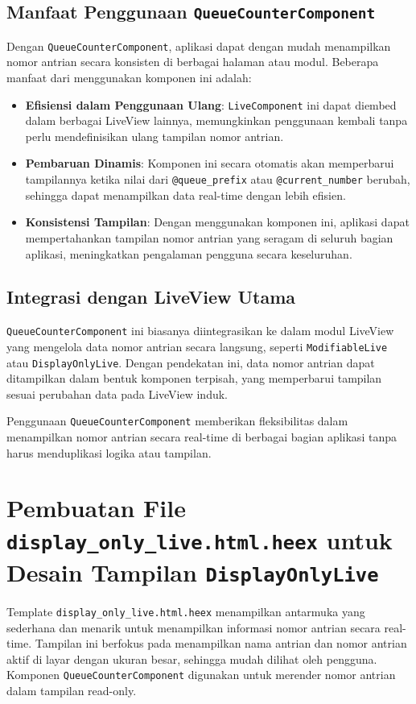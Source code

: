 \subsection{Manfaat Penggunaan \texttt{QueueCounterComponent}}
Dengan \texttt{QueueCounterComponent}, aplikasi dapat dengan mudah menampilkan nomor antrian secara konsisten di berbagai halaman atau modul. Beberapa manfaat dari menggunakan komponen ini adalah:
\begin{itemize}
	\item \textbf{Efisiensi dalam Penggunaan Ulang}: \texttt{LiveComponent} ini dapat diembed dalam berbagai LiveView lainnya, memungkinkan penggunaan kembali tanpa perlu mendefinisikan ulang tampilan nomor antrian.
	\item \textbf{Pembaruan Dinamis}: Komponen ini secara otomatis akan memperbarui tampilannya ketika nilai dari \texttt{@queue\_prefix} atau \texttt{@current\_number} berubah, sehingga dapat menampilkan data real-time dengan lebih efisien.
	\item \textbf{Konsistensi Tampilan}: Dengan menggunakan komponen ini, aplikasi dapat mempertahankan tampilan nomor antrian yang seragam di seluruh bagian aplikasi, meningkatkan pengalaman pengguna secara keseluruhan.
\end{itemize}

\subsection{Integrasi dengan LiveView Utama}
\texttt{QueueCounterComponent} ini biasanya diintegrasikan ke dalam modul LiveView yang mengelola data nomor antrian secara langsung, seperti \texttt{ModifiableLive} atau \texttt{DisplayOnlyLive}. Dengan pendekatan ini, data nomor antrian dapat ditampilkan dalam bentuk komponen terpisah, yang memperbarui tampilan sesuai perubahan data pada LiveView induk.

Penggunaan \texttt{QueueCounterComponent} memberikan fleksibilitas dalam menampilkan nomor antrian secara real-time di berbagai bagian aplikasi tanpa harus menduplikasi logika atau tampilan.


\section{Pembuatan File \texttt{display\_only\_live.html.heex} untuk Desain Tampilan \texttt{DisplayOnlyLive}}

Template \texttt{display\_only\_live.html.heex} menampilkan antarmuka yang sederhana dan menarik untuk menampilkan informasi nomor antrian secara real-time. Tampilan ini berfokus pada menampilkan nama antrian dan nomor antrian aktif di layar dengan ukuran besar, sehingga mudah dilihat oleh pengguna. Komponen \texttt{QueueCounterComponent} digunakan untuk merender nomor antrian dalam tampilan read-only.


